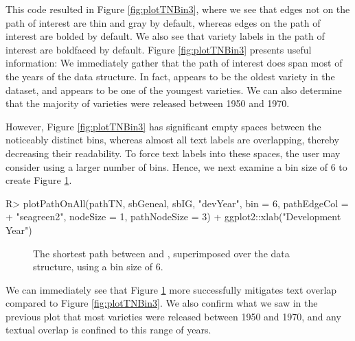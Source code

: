 \documentclass[article,shortnames]{jss}
\begin{document}
This code resulted in Figure \ref{fig:plotTNBin3}, where we see that edges not on the path of interest are thin and gray by default, whereas edges on the path of interest are bolded by default. We also see that variety labels in the path of interest are boldfaced by default. Figure \ref{fig:plotTNBin3} presents useful information: We immediately gather that the path of interest does span most of the years of the data structure. In fact,  appears to be the oldest variety in the dataset, and  appears to be one of the youngest varieties. We can also determine that the majority of varieties were released between 1950 and 1970.

However, Figure \ref{fig:plotTNBin3} has significant empty spaces between the noticeably distinct bins, whereas almost all text labels are overlapping, thereby decreasing their readability. To force text labels into these spaces, the user may consider using a larger number of bins. Hence, we next examine a bin size of 6 to create Figure \ref{fig:plotTNBin6}.

\begin{Code}
R> plotPathOnAll(pathTN, sbGeneal, sbIG, "devYear", bin = 6, pathEdgeCol =
+    "seagreen2", nodeSize = 1, pathNodeSize = 3) + ggplot2::xlab("Development Year")
\end{Code}

\begin{figure}[H]
    \centering
    \caption{The shortest path between  and , superimposed over the data structure, using a bin size of 6.}
    \label{fig:plotTNBin6}
\end{figure}

We can immediately see that Figure \ref{fig:plotTNBin6} more successfully mitigates text overlap compared to Figure \ref{fig:plotTNBin3}. We also confirm what we saw in the previous plot that most varieties were released between 1950 and 1970, and any textual overlap is confined to this range of years.
\end{document}
